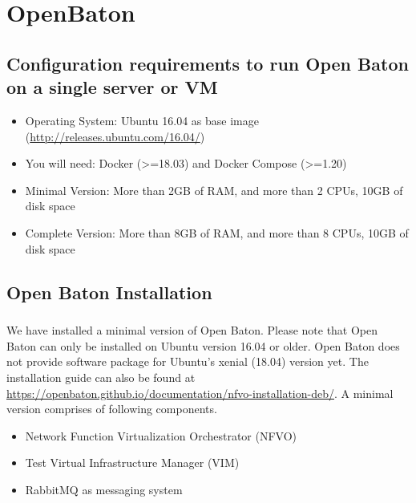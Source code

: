 \chapter{OpenBaton}
\label{ch:ob}

	\section{Configuration requirements to run Open Baton on a single server or VM}
	\label{sec:Configuration requirements to run Open Baton on a single server or VM}
	\begin{itemize}
		\item Operating System: Ubuntu 16.04 as base image (\hyperlink{name}{http://releases.ubuntu.com/16.04/})
		\item You will need: Docker (>=18.03) and Docker Compose (>=1.20)
		\item Minimal Version: More than 2GB of RAM, and more than 2 CPUs, 10GB of disk space
		\item Complete Version: More than 8GB of RAM, and more than 8 CPUs, 10GB of disk space
	\end{itemize}

	\section{Open Baton Installation}
	\label{Open Baton Installation}
		\paragraph{}
		We have installed a minimal version of Open Baton. Please note that Open Baton can only be installed on Ubuntu version 16.04 or older. Open Baton does not provide software package for Ubuntu’s xenial (18.04) version yet. The installation guide can also be found at \hyperlink{name}{https://openbaton.github.io/documentation/nfvo-installation-deb/}. A minimal version comprises of following components.
		\begin{itemize}
			\item Network Function Virtualization Orchestrator (NFVO)
			\item Test Virtual Infrastructure Manager (VIM)
			\item RabbitMQ as messaging system
		\end{itemize}
